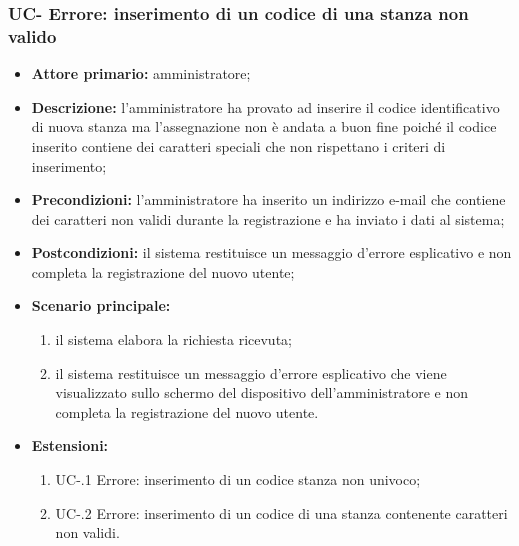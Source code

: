 \subsubsection{UC- Errore: inserimento di un codice di una stanza non valido}
\begin{itemize}
	\item \textbf{Attore primario:} amministratore;
	\item \textbf{Descrizione:} l'amministratore ha provato ad inserire il codice identificativo di nuova stanza ma l'assegnazione non è andata a buon fine poiché il codice inserito contiene dei caratteri speciali che non rispettano i criteri di inserimento;
	\item \textbf{Precondizioni:} l'amministratore ha inserito un indirizzo e-mail che contiene dei caratteri non validi durante la registrazione e ha inviato i dati al sistema;
	\item \textbf{Postcondizioni:} il sistema restituisce un messaggio d'errore esplicativo e non completa la registrazione del nuovo utente;
	\item \textbf{Scenario principale:}
	      \begin{enumerate}
		      \item il sistema elabora la richiesta ricevuta;
		      \item il sistema restituisce un messaggio d'errore esplicativo che viene visualizzato sullo schermo del dispositivo dell'amministratore e non completa la registrazione del nuovo utente.
	      \end{enumerate}
	 \item \textbf{Estensioni:}
	 	\begin{enumerate}
		       \item UC-.1 Errore: inserimento di un codice stanza non univoco;
		       \item UC-.2 Errore: inserimento di un codice di una stanza contenente caratteri non validi.
	        \end{enumerate}
\end{itemize}

